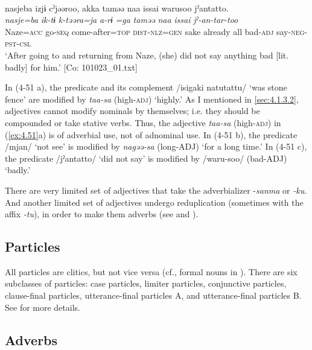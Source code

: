 \ex{}\\ 
     \glll  nasjeba  izjɨ  cˀjəəroo,  akka  taməə   naa  issai  warusoo  jˀantatto.\\
      \textit{nasje=ba}  \textit{ik-tɨ}  \textit{k-təəra=ja}  \textit{a-rɨ} \textit{=ga}  \textit{taməə}  \textit{naa}  \textit{issai}  \textit{}  \textit{jˀ-an-tar-too}\\
      Naze=\textsc{acc}  go-\textsc{seq}  come-after=\textsc{top}  \textsc{dist}-\textsc{nlz}=\textsc{gen}  sake                                                already  all  bad-\textsc{adj}  say-\textsc{neg}-\textsc{pst}-\textsc{csl}\\
      \glt ‘After going to and returning from Naze, (she) did not say anything bad [lit. badly] for him.’    [Co: 101023\_01.txt]
    \z
\z

In (4-51 a), the predicate and its complement /isigaki natutattu/ ‘was stone fence’ are modified by \textit{taa-sa} (high-\textsc{adj}) ‘highly.’ As I mentioned in \ref{sec:4.1.3.2}, adjectives cannot modify nominals by themselves; i.e. they should be compounded or take stative verbs. Thus, the adjective \textit{taa-sa} (high-\textsc{adj}) in (\ref{ex:4.51}a) is of adverbial use, not of adnominal use. In (4-51 b), the predicate /mjan/ ‘not see’ is modified by \textit{nagəə-sa} (long-ADJ) ‘for a long time.’ In (4-51 c), the predicate /jˀantatto/ ‘did not say’ is modified by /waru-soo/ (bad-ADJ) ‘badly.’

There are very limited set of adjectives that take the adverbializer -\textit{sanma} or \textit{{}-ku}. And another limited set of adjectives undergo reduplication (sometimes with the affix \textit{{}-tu}), in order to make them adverbs (see  and ).

\subsection{Particles}\label{sec:4.3.5}

All particles are clitics, but not vice versa (cf., formal nouns in ). There are six subclasses of particles: case particles, limiter particles, conjunctive particles, clause-final particles, utterance-final particles A, and utterance-final particles B. See  for more details.

\subsection{Adverbs}\label{sec:4.3.6}

